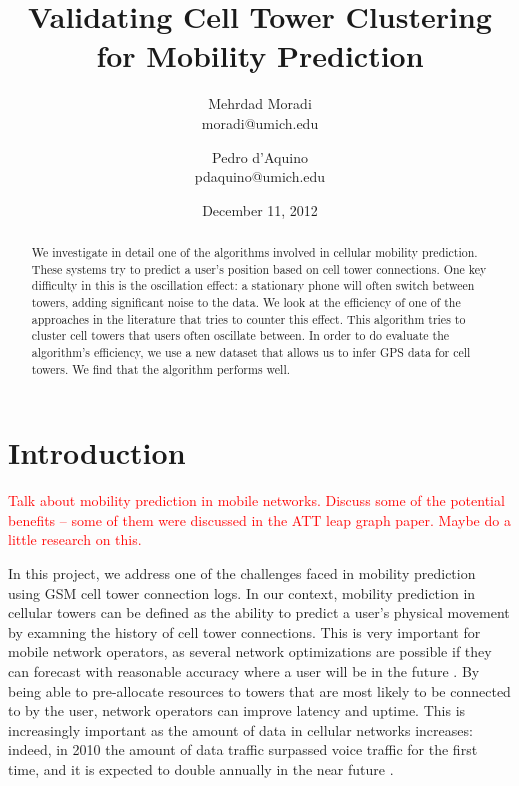 \documentclass[letterpaper, 11pt, conference]{ieeeconf}
\newcommand{\xxx}[1]{\textcolor{red}{#1}}
\begin{document}
\title{Validating Cell Tower Clustering for Mobility Prediction}
\author{Mehrdad Moradi\\moradi@umich.edu \and Pedro d'Aquino\\pdaquino@umich.edu}
\date{December 11, 2012}

\maketitle

\begin{abstract}
We investigate in detail one of the algorithms involved in cellular mobility prediction. These systems try to predict a user's position based on cell tower connections. One key difficulty in this is the oscillation effect: a stationary phone will often switch between towers, adding significant noise to the data. We look at the efficiency of one of the approaches in the literature that tries to counter this effect.  This algorithm tries to cluster cell towers that users often oscillate between. In order to do evaluate the algorithm's efficiency, we use a new dataset that allows us to infer GPS data for cell towers. We find that the algorithm performs well.
\end{abstract}

\section{Introduction}
\label{sec:intro}
\xxx{Talk about mobility prediction in mobile networks. Discuss some of the potential benefits -- some of them were discussed in the
ATT leap graph paper. Maybe do a little research on this.}

In this project, we address one of the challenges faced in mobility prediction using GSM cell tower connection logs. In our context, mobility prediction in cellular
towers can be defined as the ability to predict a user's physical movement by examning the history of cell tower connections. This is very important
for mobile network operators, as several network optimizations are possible if they can forecast with reasonable accuracy
where a user will be in the future \cite{LeapGraph} \cite{Liu97anoptimal}. By being able to pre-allocate resources to towers that are most likely to
be connected to by the user, network operators can improve latency and uptime. This is increasingly important as the amount of data in cellular networks
increases: indeed, in 2010 the amount of data traffic surpassed voice traffic for the first time, and it is expected to double annually in the near future
\cite{EricssonData}.
\end{document}

